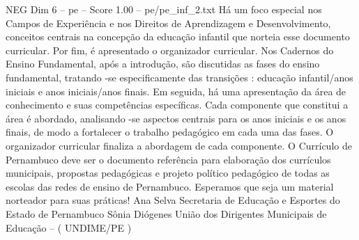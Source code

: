 \begin{textsample}{NEG Dim 6 – pe – Score 1.00 – pe/pe\_inf\_2.txt}
Há um foco especial nos Campos de Experiência e nos Direitos de Aprendizagem e Desenvolvimento, conceitos centrais na concepção da educação infantil que norteia esse documento curricular.
Por fim, é apresentado o organizador curricular.
Nos Cadernos do Ensino Fundamental, após a introdução, são discutidas as fases do ensino fundamental, tratando -se especificamente das transições : educação infantil/anos iniciais e anos iniciais/anos finais.
Em seguida, há uma apresentação da área de conhecimento e suas competências específicas.
Cada componente que constitui a área é abordado, analisando -se aspectos centrais para os anos iniciais e os anos finais, de modo a fortalecer o trabalho pedagógico em cada uma das fases.
O organizador curricular finaliza a abordagem de cada componente.
O Currículo de Pernambuco deve ser o documento referência para elaboração dos currículos municipais, propostas pedagógicas e projeto político pedagógico de todas as escolas das redes de ensino de Pernambuco.
Esperamos que seja um material norteador para suas práticas!
Ana Selva Secretaria de Educação e Esportes do Estado de Pernambuco Sônia Diógenes União dos Dirigentes Municipais de Educação – ( UNDIME/PE )

\end{textsample}
